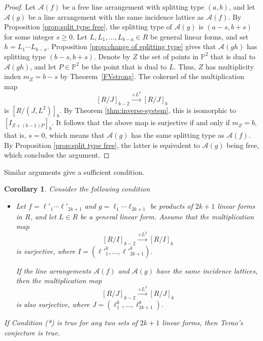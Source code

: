 \documentclass[12pt]{amsart}
\numberwithin{equation}{section}
\newtheorem{corollary}[theorem]{Corollary}
\theoremstyle{definition}
\begin{document}
\begin{proof}
Let ${\mathcal{A}} (f)$ be a free line arrangement with splitting type $(a, b)$, and let ${\mathcal{A}} (g)$ be a line arrangement with the same incidence lattice as ${\mathcal{A}} (f)$. By Proposition \ref{prop:split type free}, the splitting type of ${\mathcal{A}} (g)$ is $(a-s, b+s)$ for some integer $s \ge 0$. Let $L, L_1,\ldots,L_{b-a} \in R$ be general linear forms, and set $h = L_1 \cdots L_{b-a}$. Proposition  \ref{prop:change of splitting type} gives  that ${\mathcal{A}} (gh)$ has splitting type $(b-s, b+s)$. Denote by $Z$   the set of points in ${ \ensuremath{\mathbb{P}}}^2$ that is dual to ${\mathcal{A}} (g h)$, and let $P \in { \ensuremath{\mathbb{P}}}^2$  be the point that is dual to $L$. Thus, $Z$ has multiplicity index $m_Z = b -s$ by Theorem~\ref{FVstrong}. 
The cokernel of the 
multiplication map 
\[
[R/J]_{b-2} \stackrel{\times L^2}{\longrightarrow} [R/J]_b
\]
is $[R/(J, L^2)]_b$. By Theorem \ref{thm:inverse-system}, this is isomorphic to $[I_{Z + (b-1)P}]_b$. It follows that the above map is surjective if and only if $m_Z = b$, that is, $s = 0$, which means that   ${\mathcal{A}} (g)$ has the same splitting type as ${\mathcal{A}} (f)$. By Proposition \ref{prop:split type free}, the latter is equivalent to ${\mathcal{A}} (g)$ being free, which concludes the argument. 
\end{proof} 

Similar arguments give a sufficient condition. 

\begin{corollary} 
   \label{cor:suff Terao}
Consider the following condition
\begin{itemize}
\item[(*)] Let $f = \ell'_1 \cdots \ell'_{2k+1}$ and $g =   \ell_1 \cdots \ell_{2k+1}$ be  products of $2k+1$ linear forms in $R$, and let $L \in R$ be a general linear form. Assume that the multiplication map 
\[
[R/I]_{k-2} \stackrel{\times L^2}{\longrightarrow} [R/I]_k
\]
is surjective, where $I = (\ell'^k_1,\dots, \ell'^k_{2k+1})$.  

If the line arrangements ${\mathcal A} (f)$ and ${\mathcal A} (g)$ have the same incidence lattices, then the 
multiplication map 
\[
[R/J]_{k-2} \stackrel{\times L^2}{\longrightarrow} [R/J]_k
\]
is also surjective, where $J =   (\ell_1^k,\dots, \ell_{2k+1}^k)$. 
\end{itemize} 
If Condition (*) is true for any two sets of $2 k+1$ linear forms, then Terao's conjecture is true. 
\end{corollary} 
\end{document}
